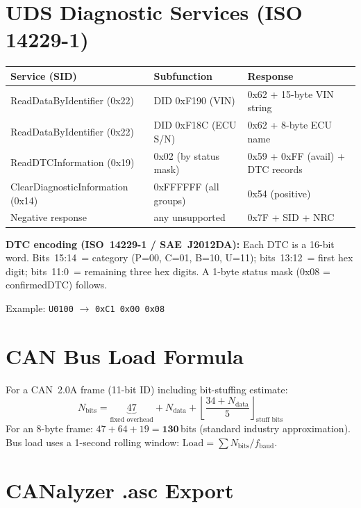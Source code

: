 \documentclass[12pt, a4paper, openany]{report}
\begin{document}
\section{UDS Diagnostic Services (ISO 14229-1)}

\begin{table}[!ht]
\centering\small
\begin{tabularx}{\textwidth}{llX}
  \toprule
  \rowcolor{TblHead}
  \color{white}\textbf{Service (SID)} &
  \color{white}\textbf{Subfunction} &
  \color{white}\textbf{Response} \\
  \midrule
  ReadDataByIdentifier (0x22)
    & DID 0xF190 (VIN)
    & 0x62 + 15-byte VIN string \\
  \rowcolor{TblAlt}
  ReadDataByIdentifier (0x22)
    & DID 0xF18C (ECU S/N)
    & 0x62 + 8-byte ECU name \\
  ReadDTCInformation (0x19)
    & 0x02 (by status mask)
    & 0x59 + 0xFF (avail) + DTC records \\
  \rowcolor{TblAlt}
  ClearDiagnosticInformation (0x14)
    & 0xFFFFFF (all groups)
    & 0x54 (positive) \\
  Negative response
    & any unsupported
    & 0x7F + SID + NRC \\
  \bottomrule
\end{tabularx}
\end{table}

\textbf{DTC encoding (ISO~14229-1 / SAE~J2012DA):} Each DTC is a 16-bit
word. Bits~15:14~= category (P=00, C=01, B=10, U=11); bits~13:12~= first
hex digit; bits~11:0~= remaining three hex digits. A 1-byte status mask
(0x08 = confirmedDTC) follows.

Example: \texttt{U0100} $\to$ \texttt{0xC1 0x00 0x08}

\section{CAN Bus Load Formula}

For a CAN~2.0A frame (11-bit ID) including bit-stuffing estimate:
\[
  N_\text{bits} = \underbrace{47}_\text{fixed overhead}
                + N_\text{data}
                + \left\lfloor\frac{34 + N_\text{data}}{5}\right\rfloor_\text{stuff bits}
\]
For an 8-byte frame: $47 + 64 + 19 = \mathbf{130}$\,bits
(standard industry approximation). Bus load uses a 1-second rolling
window: $\text{Load} = \sum N_\text{bits} / f_\text{baud}$.

\section{CANalyzer .asc Export}
\end{document}

